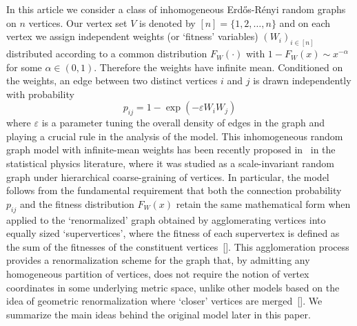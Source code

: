 \documentclass[11pt, reqno]{amsart}
\numberwithin{equation}{section}
\theoremstyle{plain} %
\theoremstyle{definition} %
\newcommand{\eps}{\varepsilon}
\begin{document}
In this article we consider a class of inhomogeneous Erd\H{o}s-R\'enyi random graphs on $n$ vertices. Our vertex set $V$ is denoted by $[n]=\{1, 2, \ldots, n\}$ and on each vertex we assign independent weights (or `fitness' variables) $(W_i)_{i\in [n]}$ distributed according to a common distribution $F_W(\cdot)$ with $1-F_W(x)\sim x^{-\alpha}$ for some $\alpha\in (0,1)$. Therefore the weights have infinite mean. Conditioned on the weights, an edge between two distinct vertices $i$ and $j$ is drawn independently with probability 
\begin{equation}\label{eq:connectionprob0}
p_{ij}= 1-\exp\left( - \eps W_i W_j\right)
\end{equation}
where $\eps$ is a parameter tuning the overall density of edges in the graph and playing a crucial rule in the analysis of the model. This inhomogeneous random graph model with infinite-mean weights has been recently proposed in~\cite{GMD2020} in the statistical physics literature, where it was studied as a scale-invariant random graph under hierarchical coarse-graining of vertices. In particular, the model follows from the fundamental requirement that both the connection probability $p_{ij}$ and the fitness distribution $F_W(x)$ retain the same mathematical form when applied to the `renormalized' graph obtained by agglomerating vertices into equally sized `supervertices', where the fitness of each supervertex is defined as the sum of the fitnesses of the constituent vertices~[\cite{GMD2020}]. This agglomeration process provides a renormalization scheme for the graph that, by admitting any homogeneous partition of vertices, does not require the notion of vertex coordinates in some underlying metric space, unlike other models based on the idea of geometric renormalization where `closer' vertices are merged~[\cite{garcia2018multiscale,boguna2021network}]. 
We summarize the main ideas behind the original model later in this paper.
\end{document}
